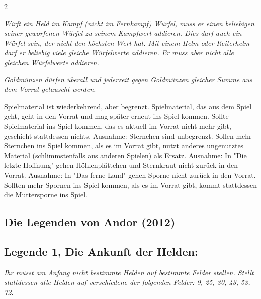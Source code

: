 \documentclass[10pt, a4paper, oneside]{book}
\newcommand{\fan}[1]{\textit{#1}}
\begin{document}
\begin{multicols*}{2}
\begin{nobgcolor}
\bullet{} \fan{Wirft ein Held im Kampf (nicht im \hyperref[Fernkämpfer]{Fernkampf}) Würfel, muss er einen beliebigen seiner geworfenen Würfel zu seinem Kampfwert addieren. Dies darf auch ein Würfel sein, der nicht den höchsten Wert hat. Mit einem Helm oder Reiterhelm darf er beliebig viele gleiche Würfelwerte addieren. Er muss aber nicht alle gleichen Würfelwerte addieren.}

\bullet{} \fan{Goldmünzen dürfen überall und jederzeit gegen Goldmünzen gleicher Summe aus dem Vorrat getauscht werden. }

\bullet{} Spielmaterial ist wiederkehrend, aber begrenzt. Spielmaterial, das aus dem Spiel geht, geht in den Vorrat und mag später erneut ins Spiel kommen. Sollte Spielmaterial ins Spiel kommen, das es aktuell im Vorrat nicht mehr gibt, geschieht stattdessen nichts.\newline
Ausnahme: Sternchen sind unbegrenzt. Sollen mehr Sternchen ins Spiel kommen, als es im Vorrat gibt, nutzt anderes ungenutztes Material (schlimmstenfalls aus anderen Spielen) als Ersatz.\newline
Ausnahme: In "Die letzte Hoffnung" gehen Höhlenplättchen\supercite{40676} und Sternkraut\supercite{DlH:Ausrüstungstafel} nicht zurück in den Vorrat.\newline
Ausnahme: In "Das ferne Land" gehen Sporne nicht zurück in den Vorrat. Sollten mehr Spornen ins Spiel kommen, als es im Vorrat gibt, kommt stattdessen die Muttersporne ins Spiel.\supercite{DfL:Begleitheft}



\end{nobgcolor}






\begin{bgcolor}
\section{Die Legenden von Andor (2012)}





\subsection{Legende 1, Die Ankunft der Helden:}

\fan{Ihr müsst am Anfang nicht bestimmte Helden auf bestimmte Felder stellen. Stellt stattdessen alle Helden auf verschiedene der folgenden Felder: 9, 25, 30, 43, 53, 72.}




\end{bgcolor}
\end{multicols*}
\end{document}

